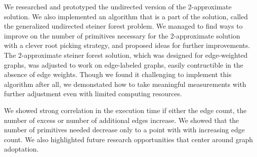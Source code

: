 \documentclass{article}
\begin{document}
We researched and prototyped the undirected version of the 2-approximate solution. We also implemented an algorithm that is a part of the solution, called the generalized undirected steiner forest problem. We managed to find ways to improve on the number of primitives necessary for the 2-approximate solution with a clever root picking strategy, and proposed ideas for further improvements. The 2-approximate steiner forest solution, which was designed for edge-weighted graphs, was adjusted to work on edge-labeled graphs, easily contructible in the absence of edge weights. Though we found it challenging to implement this algorithm after all, we demonstated how to take meaningful measurements with further adjustment even with limited computing resources.

We showed strong correlation in the execution time if either the edge count, the number of excess or number of additional edges increase. We showed that the number of primitives needed decrease only to a point with with increasing edge count. We also highlighted future research opportunities that center around graph adoptation.



\end{document}
